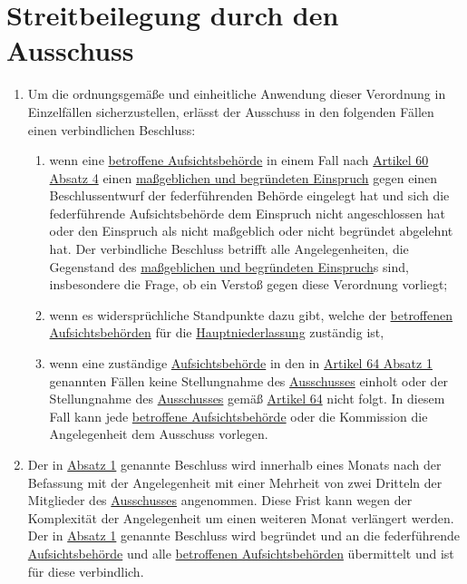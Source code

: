 \chapter{Streitbeilegung durch den Ausschuss}
\label{ch:65}


\begin{enumerate}

  \item Um die ordnungsgemäße und einheitliche Anwendung dieser Verordnung in Einzelfällen sicherzustellen, erlässt der
   Ausschuss in den folgenden Fällen einen verbindlichen Beschluss:%
  \label{itm:65-1}

  \begin{enumerate}
  
    \item wenn eine \hyperref[itm:04-22]{betroffene Aufsichtsbehörde} in einem Fall nach \hyperref[itm:60-4]{Artikel 60
     Absatz 4} einen \hyperref[itm:04-24]{maßgeblichen und begründeten Einspruch} gegen einen Beschlussentwurf der
     federführenden Behörde eingelegt hat und sich die federführende Aufsichtsbehörde dem Einspruch nicht angeschlossen
     hat oder den Einspruch als nicht maßgeblich oder nicht begründet abgelehnt hat. Der verbindliche Beschluss
     betrifft alle Angelegenheiten, die Gegenstand des \hyperref[itm:04-24]{maßgeblichen und begründeten Einspruch}s
     sind, insbesondere die Frage, ob ein Verstoß gegen diese Verordnung vorliegt;%
    \label{itm:65-1a}

    \item wenn es widersprüchliche Standpunkte dazu gibt, welche der \hyperref[itm:04-22]{betroffenen Aufsichtsbehörden}
     für die \hyperref[itm:04-16]{Hauptniederlassung} zuständig ist,%
    \label{itm:65-1b}

    \item wenn eine zuständige \hyperref[itm:04-21]{Aufsichtsbehörde} in den in \hyperref[itm:64-1]{Artikel 64 Absatz 1}
     genannten Fällen keine Stellungnahme des \hyperref[ch:68]{Ausschusses} einholt oder der Stellungnahme des \hyperref[ch:68]{Ausschusses}
     gemäß \hyperref[ch:64]{Artikel 64} nicht folgt. In diesem Fall kann jede \hyperref[itm:04-22]
     {betroffene Aufsichtsbehörde} oder die Kommission die Angelegenheit dem Ausschuss vorlegen.%
    \label{itm:65-1c}

  \end{enumerate}

  \item Der in \hyperref[itm:65-1]{Absatz 1} genannte Beschluss wird innerhalb eines Monats nach der Befassung mit der
   Angelegenheit mit einer Mehrheit von zwei Dritteln der Mitglieder des \hyperref[ch:68]{Ausschusses} angenommen. Diese Frist kann wegen
   der Komplexität der Angelegenheit um einen weiteren Monat verlängert werden. Der in \hyperref[itm:65-1]{Absatz 1}
   genannte Beschluss wird begründet und an die federführende \hyperref[itm:04-21]{Aufsichtsbehörde} und alle \hyperref
   [itm:04-22]{betroffenen Aufsichtsbehörden} übermittelt und ist für diese verbindlich.%
  \label{itm:65-2}


\end{enumerate}
